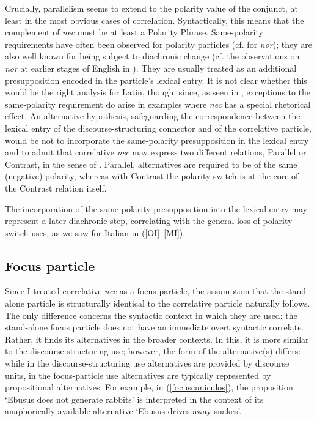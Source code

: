 \documentclass[output=paper,modfonts,nonflat,citecolor=brown,
showindex
]{langsci/langscibook}
\begin{document}
\noindent Crucially, parallelism seems to extend to the polarity value of the conjunct, at least in the most obvious cases of correlation. Syntactically, this means that the complement of {\emph{nec}} must be at least a Polarity Phrase. Same-polarity requirements have often been observed for polarity particles (cf. \citealt[519-520]{Wurmbrand08} for {\emph{nor}}); they are also well known for being subject to diachronic change (cf. the observations on {\emph{nor}} at earlier stages of English in \citealt[114]{Jespersen17}). They are usually treated as an additional presupposition encoded in the particle's lexical entry. It is not clear whether this would be the right analysis for Latin, though, since, as seen in , exceptions to the same-polarity requirement do arise in examples where {\emph{nec}} has a special rhetorical effect. An alternative hypothesis, safeguarding the correspondence between the lexical entry of the discourse-structuring connector and of the correlative particle, would be not to incorporate the same-polarity presupposition in the lexical entry and to admit that correlative {\emph{nec}} may express two different relations, Parallel or Contrast, in the sense of \citet{Asher93}. Parallel, alternatives are required to be of the same (negative) polarity, whereas with Contrast the polarity switch is at the core of the Contrast relation itself. 

The incorporation of the same-polarity presupposition into the lexical entry may represent a later diachronic step, correlating with the general \linebreak loss of polarity-switch uses, as we saw for Italian in (\ref{OI}--\ref{MI}).

\subsection{Focus particle}

Since I treated correlative {\emph{nec}} as a focus particle, the assumption that the stand-alone particle is structurally identical to the correlative particle naturally follows. The only difference concerns the syntactic context in which they are used: the stand-alone focus particle does not have an immediate overt syntactic correlate. Rather, it finds its alternatives in the broader contexts. In this, it is more similar to the discourse-structuring use; however, the form of the alternative(s) differs: while in the discourse-structuring use alternatives are provided by discourse units, in the focus-particle use alternatives are typically represented by propositional alternatives. For example, in (\ref{focuscuniculos}), the proposition `Ebusus does not generate rabbits' is interpreted in the context of its anaphorically available alternative `Ebusus drives away snakes'. 
\end{document}
